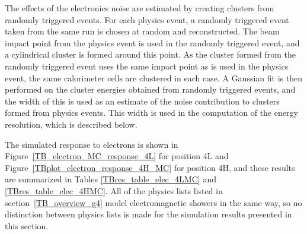 The effects of the electronics noise are estimated by creating clusters from randomly triggered events. For each physics event, a randomly triggered event taken from the same run is chosen at random and reconstructed. The beam impact point from the physics event is used in the randomly triggered event, and a cylindrical cluster is formed around this point. As the cluster formed from the randomly triggered event uses the same impact point as is used in the physics event, the same calorimeter cells are clustered in each case.  A Gaussian fit is then performed on the cluster energies obtained from randomly triggered events, and the width of this is used as an estimate of the noise contribution to clusters formed from physics events. This width is used in the computation of the energy resolution, which is described below. 







The simulated response to electrons is shown in Figure~\ref{TB_electron_MC_response_4L} for position 4L and Figure~\ref{TBplot_electron_response_4H_MC} for position 4H, and these results are summarized in Tables \ref{TBres_table_elec_4LMC} and \ref{TBres_table_elec_4HMC}. All of the physics lists listed in section~\ref{TB_overview_g4} model electromagnetic showers in the same way, so no distinction between physics lists is made for the simulation results presented in this section. 




